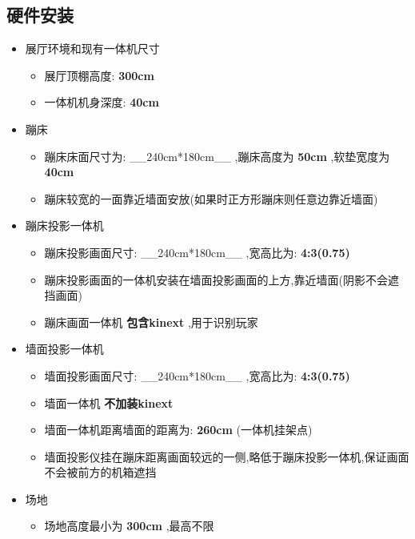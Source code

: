 \documentclass[11pt]{article}
\providecommand{\tightlist}{%
      \setlength{\itemsep}{0pt}\setlength{\parskip}{0pt}}
\begin{document}
    \subsection{硬件安装}\label{ux786cux4ef6ux5b89ux88c5}

    

    \begin{itemize}
\tightlist
\item
  展厅环境和现有一体机尺寸

  \begin{itemize}
  \tightlist
  \item
    展厅顶棚高度: \textbf{300cm}
  \item
    一体机机身深度: \textbf{40cm}
  \end{itemize}
\item
  蹦床

  \begin{itemize}
  \tightlist
  \item
    蹦床床面尺寸为: \_\_240cm*180cm\_\_ ,蹦床高度为 \textbf{50cm}
    ,软垫宽度为 \textbf{40cm}
  \item
    蹦床较宽的一面靠近墙面安放(如果时正方形蹦床则任意边靠近墙面)
  \end{itemize}
\item
  蹦床投影一体机

  \begin{itemize}
  \tightlist
  \item
    蹦床投影画面尺寸: \_\_240cm*180cm\_\_ ,宽高比为: \textbf{4:3(0.75)}
  \item
    蹦床投影画面的一体机安装在墙面投影画面的上方,靠近墙面(阴影不会遮挡画面)
  \item
    蹦床画面一体机 \textbf{包含kinext} ,用于识别玩家
  \end{itemize}
\item
  墙面投影一体机

  \begin{itemize}
  \tightlist
  \item
    墙面投影画面尺寸: \_\_240cm*180cm\_\_ ,宽高比为: \textbf{4:3(0.75)}
  \item
    墙面一体机 \textbf{不加装kinext}
  \item
    墙面一体机距离墙面的距离为: \textbf{260cm} (一体机挂架点)
  \item
    墙面投影仪挂在蹦床距离画面较远的一侧,略低于蹦床投影一体机,保证画面不会被前方的机箱遮挡
  \end{itemize}
\item
  场地

  \begin{itemize}
  \tightlist
  \item
    场地高度最小为 \textbf{300cm} ,最高不限
  \end{itemize}
\end{itemize}
\end{document}
